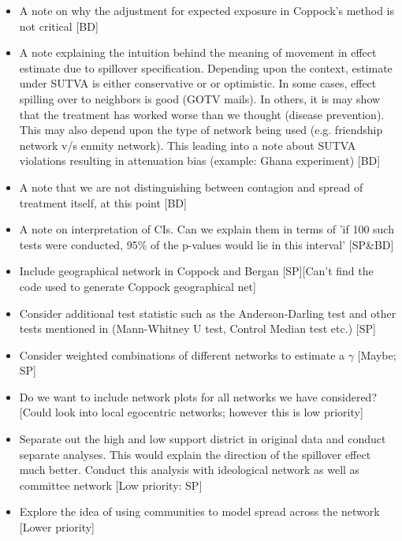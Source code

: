 \documentclass[12pt]{article}
\begin{document}
\begin{itemize}
\item A note on why the adjustment for expected exposure in Coppock's method is not critical [BD]

\item A note explaining the intuition behind the meaning of movement in effect estimate due to spillover specification. Depending upon the context, estimate under SUTVA is either conservative or or optimistic. In some cases, effect spilling over to neighbors is good (GOTV mails). In others, it is may show that the treatment has worked worse than we thought (disease prevention). This may also depend upon the type of network being used (e.g. friendship network v/s enmity network). This leading into a note about SUTVA violations resulting in attenuation bias (example: Ghana experiment) [BD]

\item A note that we are not distinguishing between contagion and spread of treatment itself, at this point [BD]

\item A note on interpretation of CIs. Can we explain them in terms of 'if 100 such tests were conducted, 95\% of the p-values would lie in this interval' [SP\&BD]

\item Include geographical network in Coppock and Bergan [SP][Can't find the code used to generate Coppock geographical net]

\item Consider additional test statistic such as the Anderson-Darling test and other tests mentioned in \citep{rosenbaum2012interference} (Mann-Whitney U test, Control Median test etc.) [SP]

\item Consider weighted combinations of different networks to estimate a $\gamma$ [Maybe; SP]

\item Do we want to include network plots for all networks we have considered? [Could look into local egocentric networks; however this is low priority]

\item Separate out the high and low support district in original data and conduct separate analyses. This would explain the direction of the spillover effect much better. Conduct this analysis with ideological network as well as committee network [Low priority: SP]

\item Explore the idea of using communities to model spread across the network [Lower priority]

\end{itemize}
\end{document}
